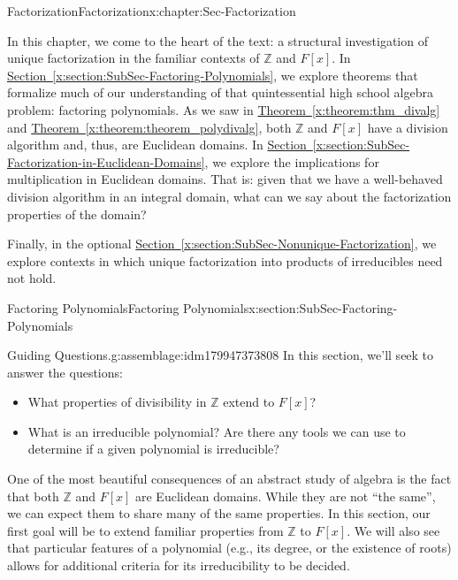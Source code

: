 \documentclass[oneside,10pt,]{book}
\newcommand{\xreffont}{\relax}
\numberwithin{equation}{section}
\def\Z{{\mathbb Z}}
\begin{document}
\begin{chapterptx}{Factorization}{}{Factorization}{}{}{x:chapter:Sec-Factorization}
\begin{introduction}{}%
In this chapter, we come to the heart of the text: a structural investigation of unique factorization in the familiar contexts of \(\Z\) and \(F[x]\). In \hyperref[x:section:SubSec-Factoring-Polynomials]{Section~{\xreffont\ref{x:section:SubSec-Factoring-Polynomials}}}, we explore theorems that formalize much of our understanding of that quintessential high school algebra problem: factoring polynomials. As we saw in \hyperref[x:theorem:thm_divalg]{Theorem~{\xreffont\ref{x:theorem:thm_divalg}}} and \hyperref[x:theorem:theorem_polydivalg]{Theorem~{\xreffont\ref{x:theorem:theorem_polydivalg}}}, both \(\Z\) and \(F[x]\) have a division algorithm and, thus, are Euclidean domains. In \hyperref[x:section:SubSec-Factorization-in-Euclidean-Domains]{Section~{\xreffont\ref{x:section:SubSec-Factorization-in-Euclidean-Domains}}}, we explore the implications for multiplication in Euclidean domains. That is: given that we have a well-behaved division algorithm in an integral domain, what can we say about the factorization properties of the domain?%
\par
Finally, in the optional \hyperref[x:section:SubSec-Nonunique-Factorization]{Section~{\xreffont\ref{x:section:SubSec-Nonunique-Factorization}}}, we explore contexts in which unique factorization into products of irreducibles need not hold.%
\end{introduction}%
%
%
\typeout{************************************************}
\typeout{************************************************}
%
\begin{sectionptx}{Factoring Polynomials}{}{Factoring Polynomials}{}{}{x:section:SubSec-Factoring-Polynomials}
\begin{assemblage}{Guiding Questions.}{g:assemblage:idm179947373808}%
In this section, we'll seek to answer the questions: %
\begin{itemize}[label=\textbullet]
\item{}What properties of divisibility in \(\Z\) extend to \(F[x]\)?%
\item{}What is an irreducible polynomial? Are there any tools we can use to determine if a given polynomial is irreducible?%
\end{itemize}
%
\end{assemblage}
One of the most beautiful consequences of an abstract study of algebra is the fact that both \(\Z\) and \(F[x]\) are Euclidean domains. While they are not ``the same'', we can expect them to share many of the same properties. In this section, our first goal will be to extend familiar properties from \(\Z\) to \(F[x]\). We will also see that particular features of a polynomial (e.g., its degree, or the existence of roots) allows for additional criteria for its irreducibility to be decided.%

\end{sectionptx}
\end{chapterptx}
\end{document}
